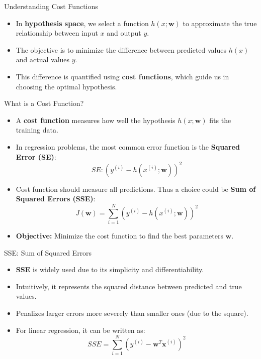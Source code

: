 \documentclass[serif, aspectratio=169]{beamer}
\begin{document}
    \begin{frame}{Understanding Cost Functions}
        \begin{itemize}
            \item In \textbf{hypothesis space}, we select a function \( h(x; \mathbf{w}) \) to approximate the true relationship between input \( x \) and output \( y \).
            \item The objective is to minimize the difference between predicted values \( h(x) \) and actual values \( y \).
            \item This difference is quantified using \textbf{cost functions}, which guide us in choosing the optimal hypothesis.
        \end{itemize}
    \end{frame}


    \begin{frame}{What is a Cost Function?}
        \begin{itemize}
            \item A \textbf{cost function} measures how well the hypothesis \( h(x; \mathbf{w}) \) fits the training data.
            \item In regression problems, the most common error function is the \textbf{Squared Error (SE)}:
            \[
                SE: \left( y^{(i)} - h(x^{(i)}; \mathbf{w}) \right)^2
            \]
            \item Cost function should measure all predictions. Thus a choice could be \textbf{Sum of Squared Errors (SSE)}:
            \[
                J(\mathbf{w}) = \sum_{i=1}^{N} \left( y^{(i)} - h(x^{(i)}; \mathbf{w}) \right)^2
            \]
            \item \textbf{Objective:} Minimize the cost function to find the best parameters \( \mathbf{w} \).

        \end{itemize}

    \end{frame}

    \begin{frame}{SSE: Sum of Squared Errors}
        \begin{itemize}
            \item \textbf{SSE} is widely used due to its simplicity and differentiability.
            \item Intuitively, it represents the squared distance between predicted and true values.
            \item Penalizes larger errors more severely than smaller ones (due to the square).
            \item For linear regression, it can be written as:
            \[
                SSE = \sum_{i=1}^{N} \left( y^{(i)} - \mathbf{w}^T \mathbf{x}^{(i)} \right)^2
            \]
        \end{itemize}
    \end{frame}
\end{document}

